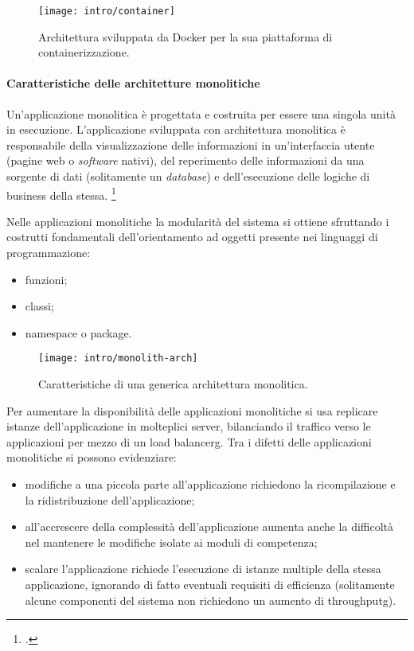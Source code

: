 \begin{figure}[H]
    \centering
    \texttt{[image: intro/container]}
    \caption{Architettura sviluppata da Docker per la sua piattaforma di containerizzazione.\\ \cite{site:docker-container}}
    \label{fig:docker-arch}
\end{figure}

\paragraph{Caratteristiche delle architetture monolitiche}

Un'applicazione monolitica è progettata e costruita per essere una singola unità in esecuzione.
L'applicazione sviluppata con architettura monolitica è responsabile della visualizzazione delle informazioni in un'interfaccia utente (pagine web o \emph{software} nativi), del reperimento delle informazioni da una sorgente di dati (solitamente un \emph{database}) e dell'esecuzione delle logiche di business della stessa.
\footcite{book:beginning-sw-eng}

Nelle applicazioni monolitiche la modularità del sistema si ottiene sfruttando i costrutti fondamentali dell'orientamento ad oggetti presente nei linguaggi di programmazione:
\begin{itemize}
  \item funzioni;
  \item classi;
  \item namespace o package.
\end{itemize}

\begin{figure}[H]
    \centering
    \texttt{[image: intro/monolith-arch]}
    \caption{Caratteristiche di una generica architettura monolitica.\\ \cite{site:fowler-microservices}}
    \label{fig:monolith-arch}
\end{figure}

Per aumentare la disponibilità delle applicazioni monolitiche si usa replicare istanze dell'applicazione in molteplici server, bilanciando il traffico verso le applicazioni per mezzo di un \gls{load balancerg}.
Tra i difetti delle applicazioni monolitiche si possono evidenziare:
\begin{itemize}
  \item modifiche a una piccola parte all'applicazione richiedono la ricompilazione e la ridistribuzione dell'applicazione;
  \item all'accrescere della complessità dell'applicazione aumenta anche la difficoltà nel mantenere le modifiche isolate ai moduli di competenza;
  \item scalare l'applicazione richiede l'esecuzione di istanze multiple della stessa applicazione, ignorando di fatto eventuali requisiti di efficienza (solitamente alcune componenti del sistema non richiedono un aumento di \gls{throughputg}).
\end{itemize}

